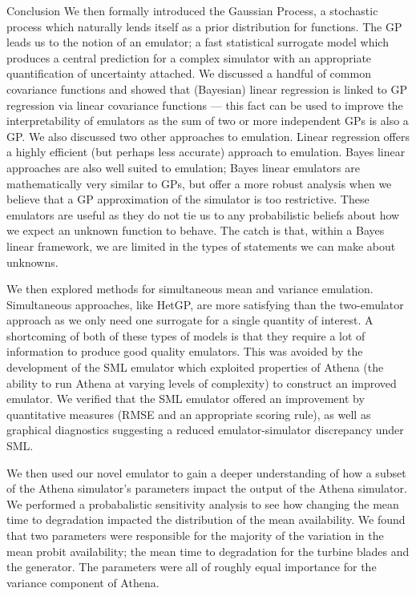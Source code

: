 \begin{chapter}{Conclusion \label{Ch:conclusions}}
We then formally introduced the Gaussian Process, a stochastic process which naturally lends itself as a prior distribution for functions. The GP leads us to the notion of an emulator; a fast statistical surrogate model which produces a central prediction for a complex simulator with an appropriate quantification of uncertainty attached. We discussed a handful of common covariance functions and showed that (Bayesian) linear regression is linked to GP regression via linear covariance functions --- this fact can be used to improve the interpretability of emulators as the sum of two or more independent GPs is also a GP. We also discussed two other approaches to emulation. Linear regression offers a highly efficient (but perhaps less accurate) approach to emulation. Bayes linear approaches are also well suited to emulation; Bayes linear emulators are mathematically very similar to GPs, but offer a more robust analysis when we believe that a GP approximation of the simulator is too restrictive. These emulators are useful as they do not tie us to any probabilistic beliefs about how we expect an unknown function to behave. The catch is that, within a Bayes linear framework, we are limited in the types of statements we can make about unknowns.

We then explored methods for simultaneous mean and variance emulation. Simultaneous approaches, like HetGP, are more satisfying than the two-emulator approach \citep{Henderson09,Andrianakis2017} as we only need one surrogate for a single quantity of interest. A shortcoming of both of these types of models is that they require a lot of information to produce good quality emulators. This was avoided by the development of the SML emulator which exploited properties of Athena (the ability to run Athena at varying levels of complexity) to construct an improved emulator. We verified that the SML emulator offered an improvement by quantitative measures (RMSE and an appropriate scoring rule), as well as graphical diagnostics  suggesting a reduced emulator-simulator discrepancy under SML.

We then used our novel emulator to gain a deeper understanding of how a subset of the Athena simulator's parameters impact the output of the Athena simulator. We performed a probabalistic sensitivity analysis to see how changing the mean time to degradation impacted the distribution of the mean availability. We found that two parameters were responsible for the majority of the variation in the mean probit availability; the mean time to degradation for the turbine blades and the generator. The parameters were all of roughly equal importance for the variance component of Athena.


\end{chapter}
